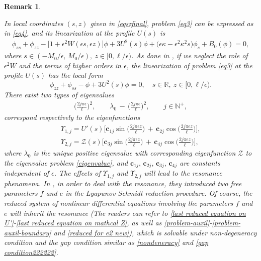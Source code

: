 \documentclass[10pt, reqno]{amsart}
\numberwithin{equation}{section}
\theoremstyle{definition}
\newtheorem{remark}[theorem]{Remark}
\begin{document}
{\begin{remark} \label{remark2-7}
{\it
In local coordinates $(s, z)$ given in \eqref{eqszfinal},  problem \eqref{eq3} can be expressed as in \eqref{eq4}, and its linearization at the profile $U(s)$ is
\begin{align}
\phi_{ss} + \phi_{zz} - \big[1+ \epsilon^2 W (\epsilon s, \epsilon z) \big] \phi + 3U^2(s)\phi
+\big(\epsilon \kappa -\epsilon^2 \kappa^2 s \big) \phi_{s}+ B_0(\phi)=0,
\label{linearproblem}
\end{align}
where $s\in (-M_0/\epsilon,\, M_0/\epsilon),\ z\in \big[0, \ell/\epsilon\big)$.
As done in \cite{delPKowWei1}, if we neglect the role of $\epsilon^2 W$ and the terms of higher orders in $\epsilon$, the linearization of problem \eqref{eq3} at the profile $U(s)$ has the local form
$$
\phi_{zz}+\phi_{ss}-\phi+3U^2(s)\phi=0, \quad s\in {\mathbb R},\ z\in \big[0, \ell/\epsilon\big).
$$
There exist two types of eigenvalues
\begin{align}
\Big(\frac{2j\pi\epsilon}{\ell}\Big)^2,
\qquad
\lambda_0\,-\,\Big(\frac{2j\pi\epsilon}{\ell}\Big)^2,
\qquad
j\in{\mathbb N}^+,
\label{eigenvalue-problem}
\end{align}
correspond respectively to the eigenfunctions
\begin{align}
\Upsilon_{1,j}=U'(s)\Bigg[\mathbf{c}_{1j}\sin\Big(\frac{2j\pi\epsilon z}{\ell}\Big)  \,+\, \mathbf{c}_{2j}\cos\Big(\frac{2j\pi\epsilon z}{\ell}\Big)\Bigg],
\\[2mm]
\Upsilon_{2,j}={\mathcal Z}(s)\Bigg[\mathbf{c}_{3j}\sin\Big(\frac{2j\pi\epsilon z}{\ell}\Big)  \,+\, \mathbf{c}_{4j}\cos\Big(\frac{2j\pi\epsilon z}{\ell}\Big)\Bigg],
\label{eigenfunction-problem}
\end{align}
where $\lambda_0$ is the unique positive eigenvalue with corresponding eigenfunction ${\mathcal Z}$ to the eigenvalue problem \eqref{eigenvalue},
 and $\mathbf{c}_{1j},\, \mathbf{c}_{2j},\, \mathbf{c}_{3j},\, \mathbf{c}_{4j}$ are constants independent of $\epsilon$.
The effects of $\Upsilon_{1,j}$ and $\Upsilon_{2,j}$ will lead to the resonance phenomena.
In \cite{delPKowWei1}, in order to deal with the resonance, they introduced two free parameters $f$ and $e$ in the Lyapunov-Schmidt reduction procedure.
Of course, the reduced system of nonlinear differential equations involving the parameters $f$ and $e$ will inherit the resonance (The readers can refer to \eqref{last reduced equation on U'}-\eqref{last reduced equation on mathcal Z}, as well as \eqref{problem-auxil}-\eqref{problem-auxil-boundary} and \eqref{reduced for e2 new}),
which is solvable under non-degeneracy condition and the gap condition similar as \eqref{nondeneracy} and \eqref{gap condition222222}.

}
\end{remark}}
\end{document}
